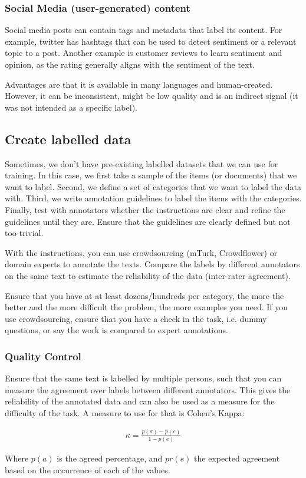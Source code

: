 \subsubsection{Social Media (user-generated) content}

Social media posts can contain tags and metadata that label its
content. For example,
twitter has hashtags that can be used to detect sentiment or a
relevant topic to a
post. Another example is customer reviews to learn sentiment and
opinion, as the rating
generally aligns with the sentiment of the text.

Advantages are that it is available in many languages and
human-created. However, it can
be inconsistent, might be low quality and is an indirect signal (it
  was not intended as
a specific label).

\subsection{Create labelled data}

Sometimes, we don't have pre-existing labelled datasets that we
can use for training. In this case, we first take a sample of
the items (or documents) that we want to label. Second, we define
a set of categories that we want to label the data with. Third, we write
annotation guidelines to label the items with the categories. Finally,
test with annotators whether the instructions are clear and refine the
guidelines until they are. Ensure that the guidelines are clearly defined
but not too trivial.

With the instructions, you can use crowdsourcing (mTurk, Crowdflower) or
domain experts to annotate the texts. Compare the labels by different
annotators on the same text to estimate the reliability of the data
(inter-rater agreement).

Ensure that you have at at least dozens/hundreds per category, the
more the better
and the more difficult the problem, the more examples you need. If
you use crowdsourcing,
ensure that you have a check in the task, i.e. dummy questions, or
say the work is compared
to expert annotations.

\subsubsection{Quality Control}

Ensure that the same text is labelled by multiple persons, such that
you can measure
the agreement over labels between different annotators. This gives
the reliability of
the annotated data and can also be used as a measure for the
difficulty of the task.
A measure to use for that is Cohen's Kappa:

\begin{definition}
  \begin{align*}
    \kappa = \frac{p(a) - p(e)}{1 - p(e)}
  \end{align*}

  Where $p(a)$ is the agreed percentage, and $pr(e)$ the expected agreement
  based on the occurrence of each of the values.
\end{definition}

